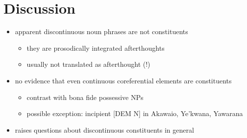 \documentclass[10pt]{article}
\begin{document}
\section{Discussion}

\begin{itemize}
\tightlist
\item
  apparent discontinuous noun phrases are not constituents

  \begin{itemize}
  \tightlist
  \item
    they are prosodically integrated afterthoughts
  \item
    usually not translated as afterthought (!)
  \end{itemize}
\item
  no evidence that even continuous coreferential elements are
  constituents

  \begin{itemize}
  \tightlist
  \item
    contrast with bona fide possessive NPs
  \item
    possible exception: incipient {[}DEM N{]} in Akawaio, Ye'kwana,
    Yawarana
  \end{itemize}
\item
  raises questions about discontinuous constituents in general
\end{itemize}

\printbibliography
\end{document}
